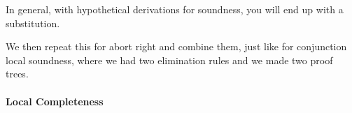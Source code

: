 \documentclass[12 pt]{article}
\begin{document}
       In general, with hypothetical derivations for soundness, you
       will end up with a substitution.

       We then repeat this for abort right and combine them, just like
       for conjunction local soundness, where we had two elimination
       rules and we made two proof trees.

       \paragraph{Local Completeness}
       \begin{center}
       \end{center}
\end{document}
